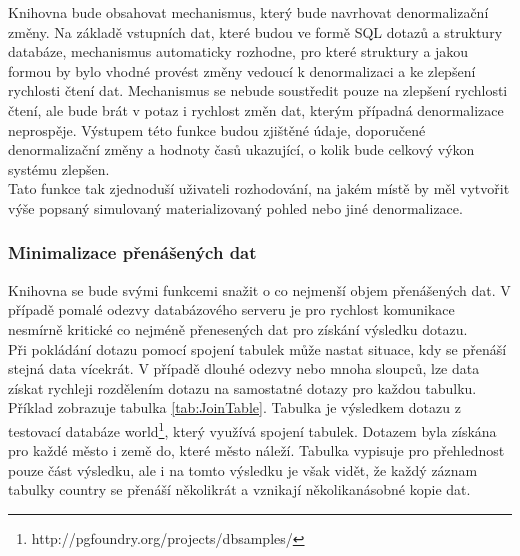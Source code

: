 \documentclass[ing,male,java,dept456]{diploma}						%
\begin{document}
Knihovna bude obsahovat mechanismus, který bude navrhovat denormalizační změny. Na základě vstupních dat, které budou ve formě SQL dotazů a struktury databáze, mechanismus automaticky rozhodne, pro které struktury a jakou formou by bylo vhodné provést změny vedoucí k denormalizaci a ke zlepšení rychlosti čtení dat. Mechanismus se nebude soustředit pouze na zlepšení rychlosti čtení, ale bude brát v potaz i rychlost změn dat, kterým případná denormalizace neprospěje. Výstupem této funkce budou zjištěné údaje, doporučené denormalizační změny a hodnoty časů ukazující, o kolik bude celkový výkon systému zlepšen. \\
Tato funkce tak zjednoduší uživateli rozhodování, na jakém místě by měl vytvořit výše popsaný simulovaný materializovaný pohled nebo jiné denormalizace.

\subsubsection{Minimalizace přenášených dat}

Knihovna se bude svými funkcemi snažit o co nejmenší objem přenášených dat. V případě pomalé odezvy databázového serveru je pro rychlost komunikace nesmírně kritické co nejméně přenesených dat pro získání výsledku dotazu. \\
Při pokládání dotazu pomocí spojení tabulek může nastat situace, kdy se přenáší stejná data vícekrát. V případě dlouhé odezvy nebo mnoha sloupců, lze data získat rychleji rozdělením dotazu na samostatné dotazy pro každou tabulku. Příklad zobrazuje tabulka \ref{tab:JoinTable}. Tabulka je výsledkem dotazu z testovací databáze world\footnote{http://pgfoundry.org/projects/dbsamples/}, který využívá spojení tabulek. Dotazem byla získána pro každé město i země do, které město náleží. Tabulka vypisuje pro přehlednost pouze část výsledku, ale i na tomto výsledku je však vidět, že každý záznam tabulky country se přenáší několikrát a vznikají několikanásobné kopie dat. \\
\end{document}
